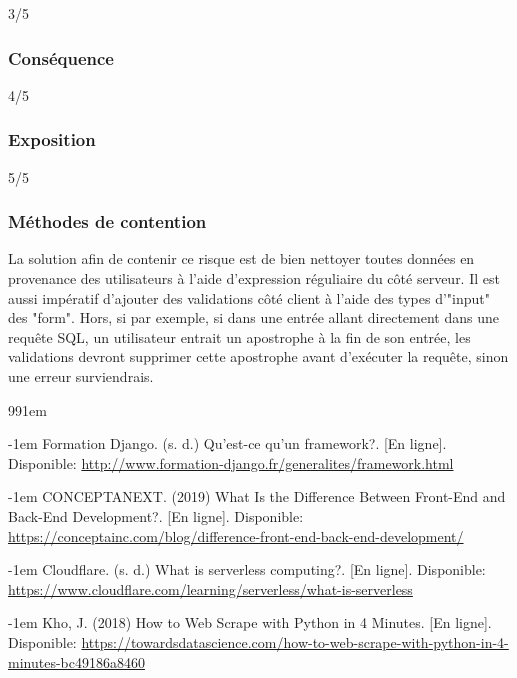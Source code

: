 \documentclass[12pt]{article}
\begin{document}
3/5

\subsubsection*{Conséquence}

4/5

\subsubsection*{Exposition}

5/5

\subsubsection*{Méthodes de contention}

La solution afin de contenir ce risque est de bien nettoyer toutes données en provenance
des utilisateurs à l'aide d'expression réguliaire du côté serveur. Il est 
aussi impératif d'ajouter des validations côté client à l'aide des types
d'"input" des "form". Hors, si par exemple, si dans une entrée allant directement
dans une requête SQL, un utilisateur entrait un apostrophe à la fin de son entrée,
les validations devront supprimer cette apostrophe avant d'exécuter la requête, sinon
une erreur surviendrais.

\newpage 

\def\bibindent{1em}
\begin{thebibliography}{99\kern\bibindent}
\makeatletter
\let\old@biblabel\@biblabel
\def\@biblabel#1{\old@biblabel{#1}\kern\bibindent}
\let\old@bibitem\bibitem
\def\bibitem#1{\old@bibitem{#1}\leavevmode\kern-\bibindent}
\makeatother

    
    Formation Django. (s. d.) Qu'est-ce qu'un framework?. [En ligne].
    Disponible: \url{http://www.formation-django.fr/generalites/framework.html}

    CONCEPTANEXT. (2019) What Is the Difference Between Front-End and Back-End Development?. [En ligne].
    Disponible: \url{https://conceptainc.com/blog/difference-front-end-back-end-development/}
    
    Cloudflare. (s. d.) What is serverless computing?. [En ligne]. Disponible:
    \url{https://www.cloudflare.com/learning/serverless/what-is-serverless}

    Kho, J. (2018) How to Web Scrape with Python in 4 Minutes. [En ligne]. Disponible:
    \url{https://towardsdatascience.com/how-to-web-scrape-with-python-in-4-minutes-bc49186a8460}

    

\end{thebibliography}
\end{document}
